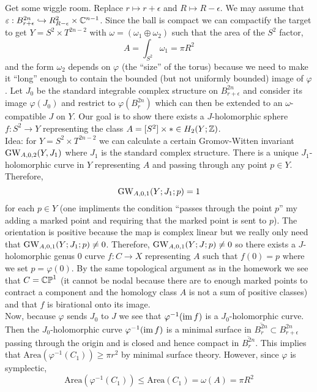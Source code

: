 \documentclass[12pt]{article}
\begin{document}
Get some wiggle room. Replace $r \mapsto r + \epsilon$ and $R \mapsto R - \epsilon$. We may assume that $\varepsilon : B^{2n}_{r + \epsilon} \hookrightarrow R^2_{R - \epsilon} \times \mathbb{C}^{n-1}$. Since the ball is compact we can compactify the target to get $Y = S^2 \times T^{2n - 2}$ with $\omega = (\omega_1 \oplus \omega_2)$ such that the area of the $S^2$ factor,
\[ A = \int_{S^2} \omega_1 = \pi R^2 \]
and the form $\omega_2$ depends on $\varphi$ (the ``size'' of the torus) because we need to make it ``long'' enough to contain the bounded (but not uniformly bounded) image of $\varphi$. Let $J_0$ be the standard integrable complex structure on $B^{2n}_{r+\epsilon}$ and consider its image $\varphi(J_0)$ and restrict to $\varphi(B^{2n}_{r})$ which can then be extended to an $\omega$-compatible $J$ on $Y$. Our goal is to show there exists a $J$-holomorphic sphere $f : S^2 \to Y$ representing the class $A = [S^2] \times * \in H_2(Y; \mathbb{Z})$. 
\bigskip\\
Idea: for $Y = S^2 \times T^{2n-2}$ we can calculate a certain Gromov-Witten invariant $\mathrm{GW}_{A,0,2}(Y, J_1)$ where $J_1$ is the standard complex structure. There is a unique $J_1$-holomorphic curve in $Y$ representing $A$ and passing through any point $p \in Y$. Therefore,
\[ \mathrm{GW}_{A,0,1}(Y; J_1; p) = 1 \]
for each $p \in Y$ (one impliments the condition ``passes through the point $p$'' my adding a marked point and requiring that the marked point is sent to $p$). The orientation is positive because the map is complex linear but we really only need that $\mathrm{GW}_{A,0,1}(Y ; J_1; p) \neq 0$. Therefore, $\mathrm{GW}_{A,0,1}(Y; J; p) \neq 0$ so there exists a $J$-holomorphic genus $0$ curve $f : C \to X$ representing $A$ such that $f(0) = p$ where we set $p = \varphi(0)$. By the same topological argument as in the homework we see that $C = \mathbb{CP}^1$ (it cannot be nodal because there are to enough marked points to contract a component and the homology class $A$ is not a sum of positive classes) and that $f$ is birational onto its image. 
\bigskip\\
Now, because $\varphi$ sends $J_0$ to $J$ we see that $\varphi^{-1}(\operatorname{\mathrm{im}}{f})$ is a $J_0$-holomorphic curve. Then the $J_0$-holomorphic curve $\varphi^{-1}(\operatorname{\mathrm{im}} f)$ is a minimal surface in $\overline{B^{2n}_r} \subset B^{2n}_{r + \epsilon}$ passing through the origin and is closed and hence compact in $\overline{B^{2n}_r}$. This implies that $\mathrm{Area}(\varphi^{-1}(C_1)) \ge \pi r^2$ by minimal surface theory. However, since $\varphi$ is symplectic,
\[ \mathrm{Area}(\varphi^{-1}(C_1)) \le \mathrm{Area}(C_1) = \omega(A) = \pi R^2 \]
\end{document}
